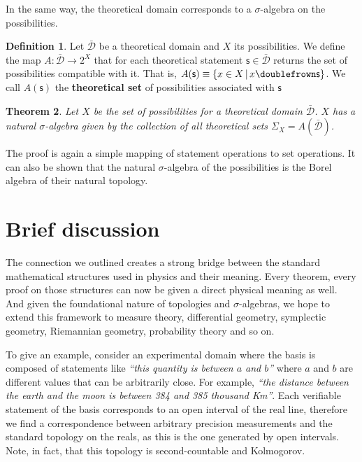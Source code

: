 \documentclass[letterpaper]{article}
\theoremstyle{plain}%
\newtheorem{thrm}{Theorem}[section]
\theoremstyle{definition}
\newtheorem{defn}[thrm]{Definition}
\theoremstyle{remark}
\numberwithin{equation}{section}
\def\comp{\doublefrown}
\newcommand{\stmt}[1][s] {\mathsf{#1}}
\newcommand{\tdomain}[1][D] {\bar{\mathcal{#1}}}
\newcommand{\statement}[1] {\emph{``#1''}}
\begin{document}
In the same way, the theoretical domain corresponds to a $\sigma$-algebra on the possibilities.

\begin{defn}
	Let $\tdomain$ be a theoretical domain and $X$ its possibilities. We define the map $A : \tdomain \rightarrow 2^X$ that for each theoretical statement $\stmt \in \tdomain$ returns the set of possibilities compatible with it. That is, $A(\stmt)\equiv\{ x \in X \, | \, x \comp \stmt\}$. We call $A(\stmt)$ the \textbf{theoretical set} of possibilities associated with $\stmt$
\end{defn}

\begin{thrm}
	Let $X$ be the set of possibilities for a theoretical domain $\tdomain$. $X$ has a natural $\sigma$-algebra given by the collection of all theoretical sets $\Sigma_X=A(\tdomain)$.
\end{thrm}

The proof is again a simple mapping of statement operations to set operations. It can also be shown that the natural $\sigma$-algebra of the possibilities is the Borel algebra of their natural topology.

\section{Brief discussion}

The connection we outlined creates a strong bridge between the standard mathematical structures used in physics and their meaning. Every theorem, every proof on those structures can now be given a direct physical meaning as well. And given the foundational nature of topologies and $\sigma$-algebras, we hope to extend this framework to measure theory, differential geometry, symplectic geometry, Riemannian geometry, probability theory and so on.

To give an example, consider an experimental domain where the basis is composed of statements like \statement{this quantity is between $a$ and $b$} where $a$ and $b$ are different values that can be arbitrarily close. For example, \statement{the distance between the earth and the moon is between 384 and 385 thousand Km}. Each verifiable statement of the basis corresponds to an open interval of the real line, therefore we find a correspondence between arbitrary precision measurements and the standard topology on the reals, as this is the one generated by open intervals. Note, in fact, that this topology is second-countable and Kolmogorov.
\end{document}
